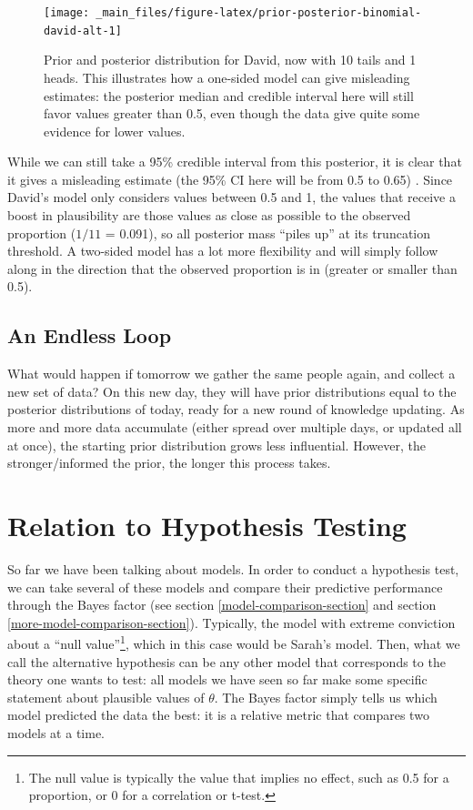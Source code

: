 \documentclass[
]{book}
\begin{document}
\begin{figure}

{\centering \texttt{[image: \_main\_files/figure-latex/prior-posterior-binomial-david-alt-1]} 

}

\caption{Prior and posterior distribution for David, now with 10 tails and 1 heads. This illustrates how a one-sided model can give misleading estimates: the posterior median and credible interval here will still favor values greater than 0.5, even though the data give quite some evidence for lower values.}\label{fig:prior-posterior-binomial-david-alt}
\end{figure}

While we can still take a 95\% credible interval from this posterior, it is clear that it gives a misleading estimate (the 95\% CI here will be from 0.5 to 0.65) . Since David's model only considers values between 0.5 and 1, the values that receive a boost in plausibility are those values as close as possible to the observed proportion (\(1/11\) = 0.091), so all posterior mass ``piles up'' at its truncation threshold. A two-sided model has a lot more flexibility and will simply follow along in the direction that the observed proportion is in (greater or smaller than 0.5).

\hypertarget{an-endless-loop}{%
\subsection{An Endless Loop}\label{an-endless-loop}}

What would happen if tomorrow we gather the same people again, and collect a new set of data? On this new day, they will have prior distributions equal to the posterior distributions of today, ready for a new round of knowledge updating. As more and more data accumulate (either spread over multiple days, or updated all at once), the starting prior distribution grows less influential. However, the stronger/informed the prior, the longer this process takes.

\hypertarget{relation-to-hypothesis-testing}{%
\section{Relation to Hypothesis Testing}\label{relation-to-hypothesis-testing}}

So far we have been talking about models. In order to conduct a hypothesis test, we can take several of these models and compare their predictive performance through the Bayes factor (see section \ref{model-comparison-section} and section \ref{more-model-comparison-section}). Typically, the model with extreme conviction about a ``null value''\footnote{The null value is typically the value that implies no effect, such as 0.5 for a proportion, or 0 for a correlation or t-test.}, which in this case would be Sarah's model. Then, what we call the alternative hypothesis can be any other model that corresponds to the theory one wants to test: all models we have seen so far make some specific statement about plausible values of \(\theta\). The Bayes factor simply tells us which model predicted the data the best: it is a relative metric that compares two models at a time.
\end{document}
